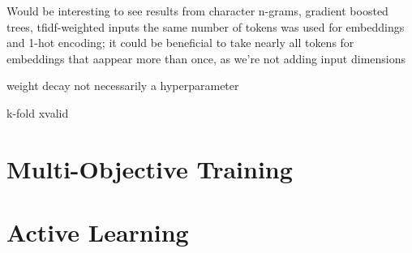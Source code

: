 Would be interesting to see results from character n-grams, gradient boosted trees, tfidf-weighted inputs
the same number of tokens was used for embeddings and 1-hot encoding; it could be beneficial to take nearly all tokens for embeddings that aappear more than once, as we're not adding input dimensions

weight decay not necessarily a hyperparameter

k-fold xvalid

\section{Multi-Objective Training}

\section{Active Learning}
